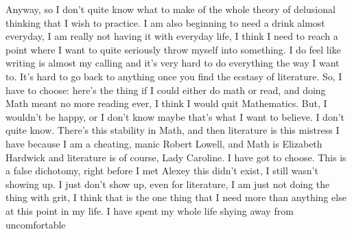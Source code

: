 Anyway, so I don't quite know what to make of the whole theory of delusional thinking that I wish to practice. I am also beginning to need a drink almost everyday, I am really not having it with everyday life, I think I need to reach a point where I want to quite seriously throw myself into something. I do feel like writing is almost my calling and it's very hard to do everything the way I want to. It's hard to go back to anything once you find the ecstasy of literature. So, I have to choose: here's the thing if I could either do math or read, and doing Math meant no more reading ever, I think I would quit Mathematics. But, I wouldn't be happy, or I don't know maybe that's what I want to believe. I don't quite know. There's this stability in Math, and then literature is this mistress I have because I am a cheating, manic Robert Lowell, and Math is Elizabeth Hardwick and literature is of course, Lady Caroline. I have got to choose. This is a false dichotomy, right before I met Alexey this didn't exist, I still wasn't showing up. I just don't show up, even for literature, I am just not doing the thing with grit, I think that is the one thing that I need more than anything else at this point in my life. I have spent my whole life shying away from uncomfortable 